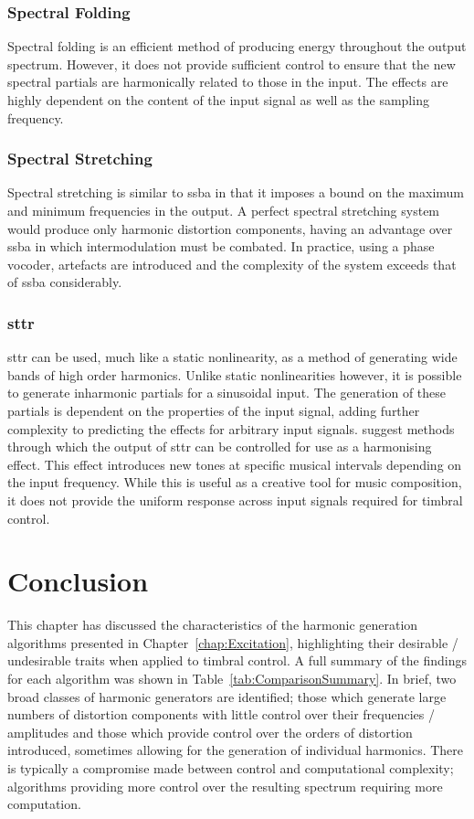		\subsubsection*{Spectral Folding}
			Spectral folding is an efficient method of producing energy throughout the output spectrum.
			However, it does not provide sufficient control to ensure that the new spectral partials are
			harmonically related to those in the input. The effects are highly dependent on the content of the
			input signal as well as the sampling frequency.

		\subsubsection*{Spectral Stretching}
			Spectral stretching is similar to \acrshort{ssba} in that it imposes a bound on the maximum and
			minimum frequencies in the output. A perfect spectral stretching system would produce only harmonic
			distortion components, having an advantage over \acrshort{ssba} in which intermodulation must be
			combated. In practice, using a phase vocoder, artefacts are introduced and the complexity of the
			system exceeds that of \acrshort{ssba} considerably.

		\subsubsection*{\acrshort{sttr}}
			\acrshort{sttr} can be used, much like a static nonlinearity, as a method of generating wide bands
			of high order harmonics. Unlike static nonlinearities however, it is possible to generate
			inharmonic partials for a sinusoidal input. The generation of these partials is dependent on the
			properties of the input signal, adding further complexity to predicting the effects for arbitrary
			input signals.  \citet{kim2015harmonizing} suggest methods through which the output of
			\acrshort{sttr} can be controlled for use as a harmonising effect. This effect introduces new tones
			at specific musical intervals depending on the input frequency. While this is useful as a creative
			tool for music composition, it does not provide the uniform response across input signals required
			for timbral control.

\section{Conclusion}
	This chapter has discussed the characteristics of the harmonic generation algorithms presented in
	Chapter~\ref{chap:Excitation}, highlighting their desirable / undesirable traits when applied to timbral control.
	A full summary of the findings for each algorithm was shown in Table~\ref{tab:ComparisonSummary}. In brief, two
	broad classes of harmonic generators are identified; those which generate large numbers of distortion components
	with little control over their frequencies / amplitudes and those which provide control over the orders of
	distortion introduced, sometimes allowing for the generation of individual harmonics. There is typically a
	compromise made between control and computational complexity; algorithms providing more control over the resulting
	spectrum requiring more computation.

